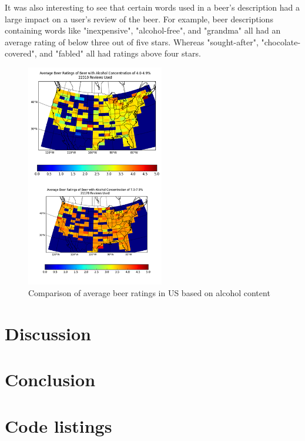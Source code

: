 \documentclass[10pt]{IEEEtran}
\begin{document}
{It was also interesting to see that certain words used in a beer's description had a large impact on a user's review of the beer. For example, beer descriptions containing words like "inexpensive", "alcohol-free", and "grandma" all had an average rating of below three out of five stars. Whereas "sought-after", "chocolate-covered", and "fabled" all had ratings above four stars.

\begin{figure}[t]
  \centering
  \includegraphics[width=6cm]{./graphics/abvComp.png}
  \caption{Comparison of average beer ratings in US based on alcohol content}
  \label{fig:abvcomp}
\end{figure}

\section{Discussion}


\section{Conclusion}






\clearpage
\onecolumn
\appendices
\section{Code listings}

\lstlistoflistings

}
\end{document}
